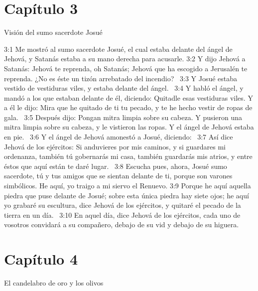 \section*{Capítulo 3 }
Visión del sumo sacerdote Josué  

3:1 Me mostró al sumo sacerdote Josué, el cual estaba delante del ángel de Jehová, y Satanás estaba a su mano derecha para acusarle. 
3:2 Y dijo Jehová a Satanás: Jehová te reprenda, oh Satanás; Jehová que ha escogido a Jerusalén te reprenda. ¿No es éste un tizón arrebatado del incendio?  
3:3 Y Josué estaba vestido de vestiduras viles, y estaba delante del ángel.  
3:4 Y habló el ángel, y mandó a los que estaban delante de él, diciendo: Quitadle esas vestiduras viles. Y a él le dijo: Mira que he quitado de ti tu pecado, y te he hecho vestir de ropas de gala.  
3:5 Después dijo: Pongan mitra limpia sobre su cabeza. Y pusieron una mitra limpia sobre su cabeza, y le vistieron las ropas. Y el ángel de Jehová estaba en pie.  
3:6 Y el ángel de Jehová amonestó a Josué, diciendo:  
3:7 Así dice Jehová de los ejércitos: Si anduvieres por mis caminos, y si guardares mi ordenanza, también tú gobernarás mi casa, también guardarás mis atrios, y entre éstos que aquí están te daré lugar.  
3:8 Escucha pues, ahora, Josué sumo sacerdote, tú y tus amigos que se sientan delante de ti, porque son varones simbólicos. He aquí, yo traigo a mi siervo el Renuevo. 
3:9 Porque he aquí aquella piedra que puse delante de Josué; sobre esta única piedra hay siete ojos; he aquí yo grabaré su escultura, dice Jehová de los ejércitos, y quitaré el pecado de la tierra en un día.  
3:10 En aquel día, dice Jehová de los ejércitos, cada uno de vosotros convidará a su compañero, debajo de su vid y debajo de su higuera. 
\section*{Capítulo 4 }
El candelabro de oro y los olivos  


